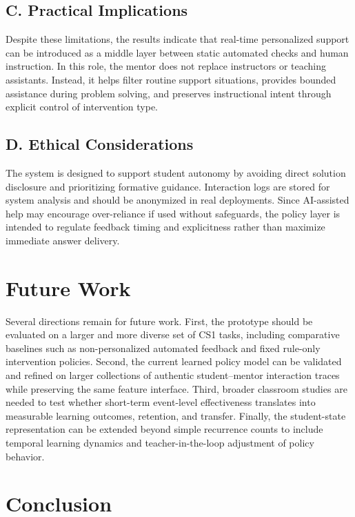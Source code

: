 \documentclass[conference]{IEEEtran}
\begin{document}
\subsection*{C. Practical Implications}

Despite these limitations, the results indicate that real-time personalized support can be introduced as a middle layer between static automated checks and human instruction. In this role, the mentor does not replace instructors or teaching assistants. Instead, it helps filter routine support situations, provides bounded assistance during problem solving, and preserves instructional intent through explicit control of intervention type.

\subsection*{D. Ethical Considerations}

The system is designed to support student autonomy by avoiding direct solution disclosure and prioritizing formative guidance. Interaction logs are stored for system analysis and should be anonymized in real deployments. Since AI-assisted help may encourage over-reliance if used without safeguards, the policy layer is intended to regulate feedback timing and explicitness rather than maximize immediate answer delivery.

\section{Future Work}

Several directions remain for future work. First, the prototype should be evaluated on a larger and more diverse set of CS1 tasks, including comparative baselines such as non-personalized automated feedback and fixed rule-only intervention policies. Second, the current learned policy model can be validated and refined on larger collections of authentic student--mentor interaction traces while preserving the same feature interface. Third, broader classroom studies are needed to test whether short-term event-level effectiveness translates into measurable learning outcomes, retention, and transfer. Finally, the student-state representation can be extended beyond simple recurrence counts to include temporal learning dynamics and teacher-in-the-loop adjustment of policy behavior.

\section{Conclusion}
\end{document}
